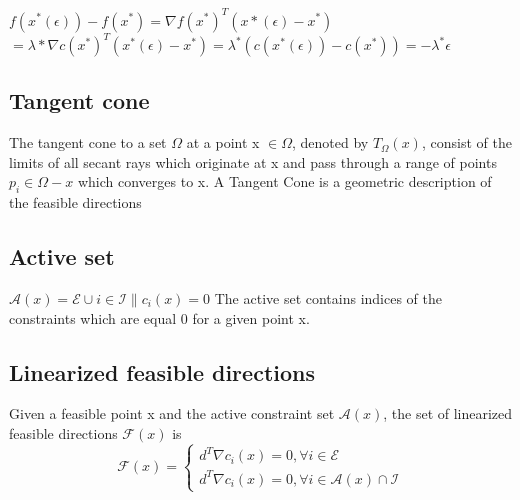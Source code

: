 $f(x^*(\epsilon))-f(x^*) = \nabla f(x^*)^T (x*(\epsilon)-x^*)$
$= \lambda* \nabla c(x^*)^T (x^*(\epsilon)-x^*) = \lambda^*(c(x^*(\epsilon))-c(x^*)) = -\lambda^* \epsilon$

\subsection{Tangent cone}
The tangent cone to a set $\Omega$ at a point x $\in \Omega$, denoted by $T_\Omega (x)$, consist of the limits of all secant rays which originate
at x and pass through a range of points $p_i \in \Omega - {x}$ which converges to x.
A Tangent Cone is a geometric description of the feasible directions
\subsection{Active set}
$\mathcal{A} (x) = \mathcal{E} \cup { i \in \mathcal{I}\|c_i(x) = 0}$
The active set contains indices of the constraints which are equal 0 for a given point x.

\subsection{Linearized feasible directions}
Given a feasible point x and the active constraint set $\mathcal{A} (x)$, the set of linearized feasible directions $\mathcal{F}(x)$ is 
\begin{equation}
    \mathcal{F}(x) = \left\{ 
        \begin{aligned}
        d^T\nabla c_i(x)=0, \forall i \in \mathcal{E} \\
        d^T\nabla c_i(x)=0, \forall i \in \mathcal{A}(x) \cap \mathcal{I}
    \end{aligned}
    \right.
\end{equation}


